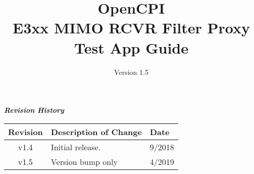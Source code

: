 \iffalse
This file is protected by Copyright. Please refer to the COPYRIGHT file
distributed with this source distribution.

This file is part of OpenCPI <http://www.opencpi.org>

OpenCPI is free software: you can redistribute it and/or modify it under the
terms of the GNU Lesser General Public License as published by the Free Software
Foundation, either version 3 of the License, or (at your option) any later
version.

OpenCPI is distributed in the hope that it will be useful, but WITHOUT ANY
WARRANTY; without even the implied warranty of MERCHANTABILITY or FITNESS FOR A
PARTICULAR PURPOSE. See the GNU Lesser General Public License for more details.

You should have received a copy of the GNU Lesser General Public License along
with this program. If not, see <http://www.gnu.org/licenses/>.
\fi

\def\docTitle{OpenCPI\\ E3xx MIMO RCVR Filter Proxy Test App Guide}
\def\docVersion{1.5}

\date{Version \docVersion} %
\title{\docTitle}
\usepackage{graphicx}
\graphicspath{ {figures/} }
\usepackage{textcomp}
\usepackage{listings}


\maketitle
	\begin{center}
	\textit{\textbf{Revision History}}
		\begin{table}[H]
		\label{table:revisions} %
			\begin{tabularx}{\textwidth}{|c|X|l|}
			\hline
			\rowcolor{blue}
			\textbf{Revision} & \textbf{Description of Change} & \textbf{Date} \\
		    \hline
		    v1.4 & Initial release. & 9/2018 \\
			\hline
		    v1.5 & Version bump only & 4/2019 \\
			\hline
			\end{tabularx}
		\end{table}
	\end{center}

